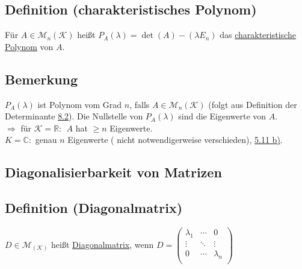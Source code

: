 \documentclass[a4paper, 12pt,titlepage, pdf, headsepline]{article}
\newcommand{\R}{\mathds{R}}
\newcommand{\K}{\mathcal{K}}
\newcommand{\M}{\mathcal{M}}
\newcommand{\C}{\mathds{C}}
\newcommand{\uline}[1]{\underline{#1}}
\renewcommand{\>}{\rightarrow}
\renewcommand{\*}{\cdot}
\begin{document}
\subsection{Definition (charakteristisches Polynom)}
Für $A \in \M_n(\K)$ heißt $P_A(\lambda) = \det(A)-(\lambda E_n)$ das \uline{charakteristische Polynom} von $A$.
\subsection{Bemerkung}
$P_A(\lambda)$ ist Polynom vom Grad $n$, falls $A \in \M_n(\K)$ (folgt aus Definition der Determinante \hyperref[8.2]{8.2}). Die Nullstelle von $P_A(\lambda)$ sind die Eigenwerte von $A$.\\
$\Rightarrow $ für $\K = \R:~~A $ hat $ \geq n$ Eigenwerte.\\
$K = \C: $ genau $n$ Eigenwerte ( nicht notwendigerweise verschieden), \hyperref[5.11]{5.11 b)}.
\subsection*{Diagonalisierbarkeit von Matrizen}
\subsection{Definition (Diagonalmatrix)}
$D \in \M_(\K)$ heißt \uline{Diagonalmatrix}, wenn $D = \begin{pmatrix}
\lambda_1 & \cdots & 0 \\
\vdots & \ddots & \vdots \\
0 & \cdots & \lambda_n \\
\end{pmatrix}$
\end{document}
